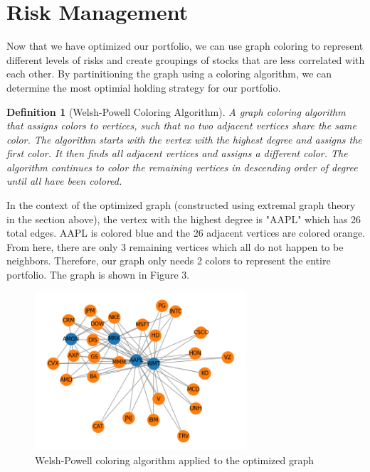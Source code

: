 \documentclass{article}
\newtheorem{definition}[theorem]{Definition}
\begin{document}
\section{Risk Management}

Now that we have optimized our portfolio, we can use graph coloring to represent different levels of risks and create groupings of stocks that are less correlated with each other. By partinitioning the graph using a coloring algorithm, we can determine the most optimial holding strategy for our portfolio.

\begin{definition}[Welsh-Powell Coloring Algorithm]
A graph coloring algorithm that assigns colors to vertices, such that no two adjacent vertices share the same color. The algorithm starts with the vertex with the highest degree and assigns the first color. It then finds all adjacent vertices and assigns a different color. The algorithm continues to color the remaining vertices in descending order of degree until all have been colored. 
\end{definition}

In the context of the optimized graph (constructed using extremal graph theory in the section above), the vertex with the highest degree is "AAPL" which has 26 total edges. AAPL is colored blue and the 26 adjacent vertices are colored orange. From here, there are only 3 remaining vertices which all do not happen to be neighbors. Therefore, our graph only needs 2 colors to represent the entire portfolio. The graph is shown in Figure 3.

\begin{figure}[h]
    \caption{Welsh-Powell coloring algorithm applied to the optimized graph}
    \centering
    \includegraphics[width=0.7\textwidth]{welsh_powell_coloring.png}
\end{figure}
\end{document}
